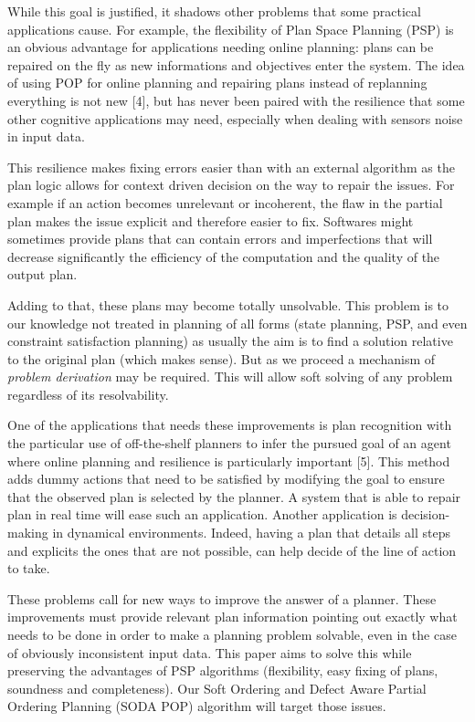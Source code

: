 \documentclass[]{article}
\begin{document}
While this goal is justified, it shadows other problems that some
practical applications cause. For example, the flexibility of Plan Space
Planning (PSP) is an obvious advantage for applications needing online
planning: plans can be repaired on the fly as new informations and
objectives enter the system. The idea of using POP for online planning
and repairing plans instead of replanning everything is not new {[}4{]},
but has never been paired with the resilience that some other cognitive
applications may need, especially when dealing with sensors noise in
input data.

This resilience makes fixing errors easier than with an external
algorithm as the plan logic allows for context driven decision on the
way to repair the issues. For example if an action becomes unrelevant or
incoherent, the flaw in the partial plan makes the issue explicit and
therefore easier to fix. Softwares might sometimes provide plans that
can contain errors and imperfections that will decrease significantly
the efficiency of the computation and the quality of the output plan.

Adding to that, these plans may become totally unsolvable. This problem
is to our knowledge not treated in planning of all forms (state
planning, PSP, and even constraint satisfaction planning) as usually the
aim is to find a solution relative to the original plan (which makes
sense). But as we proceed a mechanism of \emph{problem derivation} may
be required. This will allow soft solving of any problem regardless of
its resolvability.

One of the applications that needs these improvements is plan
recognition with the particular use of off-the-shelf planners to infer
the pursued goal of an agent where online planning and resilience is
particularly important {[}5{]}. This method adds dummy actions that need
to be satisfied by modifying the goal to ensure that the observed plan
is selected by the planner. A system that is able to repair plan in real
time will ease such an application. Another application is
decision-making in dynamical environments. Indeed, having a plan that
details all steps and explicits the ones that are not possible, can help
decide of the line of action to take.

These problems call for new ways to improve the answer of a planner.
These improvements must provide relevant plan information pointing out
exactly what needs to be done in order to make a planning problem
solvable, even in the case of obviously inconsistent input data. This
paper aims to solve this while preserving the advantages of PSP
algorithms (flexibility, easy fixing of plans, soundness and
completeness). Our Soft Ordering and Defect Aware Partial Ordering
Planning (SODA POP) algorithm will target those issues.
\end{document}
